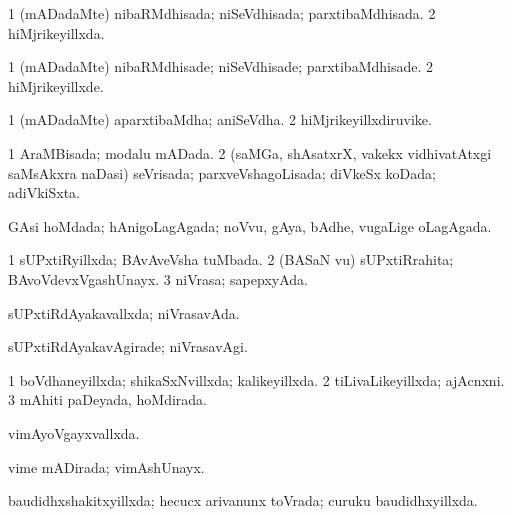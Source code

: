 {{\bentry
{} 
\gl{\gu}
\expl{}
\bmng
\bnum
\num{1} (mADadaMte) nibaRMdhisada; niSeVdhisada; parxtibaMdhisada. 
\num{2} hiMjrikeyillxda. 
\enum
\emng
\eentry

\bentry
{} 
\gl{\kirxvi}
\expl{}
\bmng
\bnum
\num{1} (mADadaMte) nibaRMdhisade; niSeVdhisade; parxtibaMdhisade. 
\num{2} hiMjrikeyillxde. 
\enum
\emng
\eentry

\bentry
{} 
\gl{\nA}
\expl{}
\bmng
\bnum
\num{1} (mADadaMte) aparxtibaMdha; aniSeVdha. 
\num{2} hiMjrikeyillxdiruvike. 
\enum
\emng
\eentry

\bentry
{} 
\gl{\gu}
\expl{}
\bmng
\bnum
\num{1} AraMBisada; modalu mADada. 
\num{2} (saMGa, shAsatxrX, \mo vakekx vidhivatAtxgi saMsAkxra naDasi) seVrisada; parxveVshagoLisada; diVkeSx koDada; adiVkiSxta. 
\enum
\emng
\eentry

\bentry
{} 
\gl{\gu}
\expl{}
\bmng
GAsi hoMdada; hAnigoLagAgada; noVvu, gAya, bAdhe, \mo vugaLige oLagAgada. 
\emng
\eentry

\bentry
{} 
\gl{\gu}
\expl{}
\bmng
\bnum
\num{1} sUPxtiRyillxda; BAvAveVsha tuMbada. 
\num{2} (BASaN \mo vu) sUPxtiRrahita; BAvoVdevxVgashUnayx. 
\num{3} niVrasa; sapepxyAda. 
\enum
\emng
\eentry

\bentry
{} 
\gl{\gu}
\expl{}
\bmng
sUPxtiRdAyakavallxda; niVrasavAda. 
\emng
\eentry

\bentry
{} 
\gl{\kirxvi}
\expl{}
\bmng
sUPxtiRdAyakavAgirade; niVrasavAgi. 
\emng
\eentry

\bentry
{} 
\gl{\gu}
\expl{}
\bmng
\bnum
\num{1} boVdhaneyillxda; shikaSxNvillxda; kalikeyillxda. 
\num{2} tiLivaLikeyillxda; ajAcnxni. 
\num{3} mAhiti paDeyada, hoMdirada. 
\enum
\emng
\eentry

\bentry
{} 
\gl{\gu}
\expl{}
\bmng
vimAyoVgayxvallxda. 
\emng
\eentry

\bentry
{} 
\gl{\gu}
\expl{}
\bmng
vime mADirada; vimAshUnayx. 
\emng
\eentry

\bentry
{} 
\gl{\gu}
\expl{}
\bmng
baudidhxshakitxyillxda; hecucx arivanunx toVrada; curuku baudidhxyillxda. 
\emng
\eentry

}}
